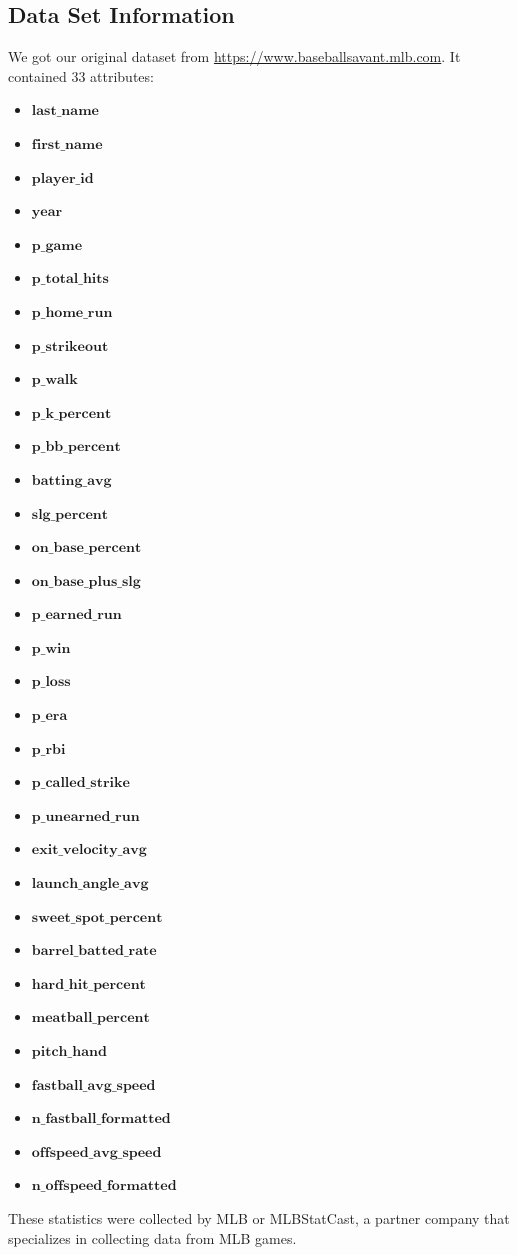\documentclass[12pt]{article}
\begin{document}
\subsection{Data Set Information}
We got our original dataset from \url{https://www.baseballsavant.mlb.com}. It contained 33 attributes: 
\begin{itemize}
    \item $\textbf{last\_name}$
    \item $\textbf{first\_name}$
    \item $\textbf{player\_id}$
    \item $\textbf{year}$
    \item $\textbf{p\_game}$
    \item $\textbf{p\_total\_hits}$
    \item $\textbf{p\_home\_run}$
    \item $\textbf{p\_strikeout}$
    \item $\textbf{p\_walk}$
    \item $\textbf{p\_k\_percent}$
    \item $\textbf{p\_bb\_percent}$
    \item $\textbf{batting\_avg}$
    \item $\textbf{slg\_percent}$
    \item $\textbf{on\_base\_percent}$
    \item $\textbf{on\_base\_plus\_slg}$
    \item $\textbf{p\_earned\_run}$
    \item $\textbf{p\_win}$
    \item $\textbf{p\_loss}$
    \item $\textbf{p\_era}$
    \item $\textbf{p\_rbi}$
    \item $\textbf{p\_called\_strike}$
    \item $\textbf{p\_unearned\_run}$
    \item $\textbf{exit\_velocity\_avg}$
    \item $\textbf{launch\_angle\_avg}$
    \item $\textbf{sweet\_spot\_percent}$
    \item $\textbf{barrel\_batted\_rate}$
    \item $\textbf{hard\_hit\_percent}$
    \item $\textbf{meatball\_percent}$
    \item $\textbf{pitch\_hand}$
    \item $\textbf{fastball\_avg\_speed}$
    \item $\textbf{n\_fastball\_formatted}$
    \item $\textbf{offspeed\_avg\_speed}$
    \item $\textbf{n\_offspeed\_formatted}$
\end{itemize}
These statistics were collected by MLB or MLBStatCast, a partner company that specializes in collecting data from MLB games.  
\end{document}
